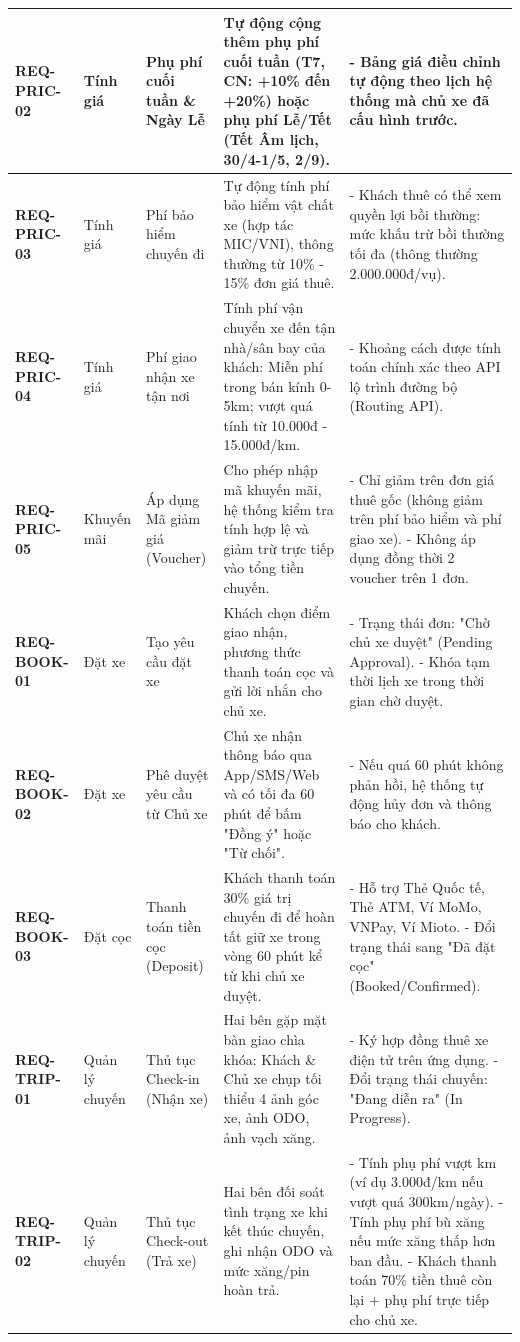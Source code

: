 {\begin{longtable}{p{2.3cm}p{2.2cm}p{2.8cm}p{4.2cm}p{3.8cm}}
\textbf{REQ-PRIC-02} & Tính giá & Phụ phí cuối tuần \& Ngày Lễ & Tự động cộng thêm phụ phí cuối tuần (T7, CN: +10\% đến +20\%) hoặc phụ phí Lễ/Tết (Tết Âm lịch, 30/4-1/5, 2/9). & - Bảng giá điều chỉnh tự động theo lịch hệ thống mà chủ xe đã cấu hình trước. \\ \midrule
\textbf{REQ-PRIC-03} & Tính giá & Phí bảo hiểm chuyến đi & Tự động tính phí bảo hiểm vật chất xe (hợp tác MIC/VNI), thông thường từ 10\% - 15\% đơn giá thuê. & - Khách thuê có thể xem quyền lợi bồi thường: mức khấu trừ bồi thường tối đa (thông thường 2.000.000đ/vụ). \\ \midrule
\textbf{REQ-PRIC-04} & Tính giá & Phí giao nhận xe tận nơi & Tính phí vận chuyển xe đến tận nhà/sân bay của khách: Miễn phí trong bán kính 0-5km; vượt quá tính từ 10.000đ - 15.000đ/km. & - Khoảng cách được tính toán chính xác theo API lộ trình đường bộ (Routing API). \\ \midrule
\textbf{REQ-PRIC-05} & Khuyến mãi & Áp dụng Mã giảm giá (Voucher) & Cho phép nhập mã khuyến mãi, hệ thống kiểm tra tính hợp lệ và giảm trừ trực tiếp vào tổng tiền chuyến. & - Chỉ giảm trên đơn giá thuê gốc (không giảm trên phí bảo hiểm và phí giao xe). - Không áp dụng đồng thời 2 voucher trên 1 đơn. \\ \midrule
\textbf{REQ-BOOK-01} & Đặt xe & Tạo yêu cầu đặt xe & Khách chọn điểm giao nhận, phương thức thanh toán cọc và gửi lời nhắn cho chủ xe. & - Trạng thái đơn: "Chờ chủ xe duyệt" (Pending Approval). - Khóa tạm thời lịch xe trong thời gian chờ duyệt. \\ \midrule
\textbf{REQ-BOOK-02} & Đặt xe & Phê duyệt yêu cầu từ Chủ xe & Chủ xe nhận thông báo qua App/SMS/Web và có tối đa 60 phút để bấm "Đồng ý" hoặc "Từ chối". & - Nếu quá 60 phút không phản hồi, hệ thống tự động hủy đơn và thông báo cho khách. \\ \midrule
\textbf{REQ-BOOK-03} & Đặt cọc & Thanh toán tiền cọc (Deposit) & Khách thanh toán 30\% giá trị chuyến đi để hoàn tất giữ xe trong vòng 60 phút kể từ khi chủ xe duyệt. & - Hỗ trợ Thẻ Quốc tế, Thẻ ATM, Ví MoMo, VNPay, Ví Mioto. - Đổi trạng thái sang "Đã đặt cọc" (Booked/Confirmed). \\ \midrule
\textbf{REQ-TRIP-01} & Quản lý chuyến & Thủ tục Check-in (Nhận xe) & Hai bên gặp mặt bàn giao chìa khóa: Khách \& Chủ xe chụp tối thiểu 4 ảnh góc xe, ảnh ODO, ảnh vạch xăng. & - Ký hợp đồng thuê xe điện tử trên ứng dụng. - Đổi trạng thái chuyến: "Đang diễn ra" (In Progress). \\ \midrule
\textbf{REQ-TRIP-02} & Quản lý chuyến & Thủ tục Check-out (Trả xe) & Hai bên đối soát tình trạng xe khi kết thúc chuyến, ghi nhận ODO và mức xăng/pin hoàn trả. & - Tính phụ phí vượt km (ví dụ 3.000đ/km nếu vượt quá 300km/ngày). - Tính phụ phí bù xăng nếu mức xăng thấp hơn ban đầu. - Khách thanh toán 70\% tiền thuê còn lại + phụ phí trực tiếp cho chủ xe. \\ \midrule

\end{longtable}}

